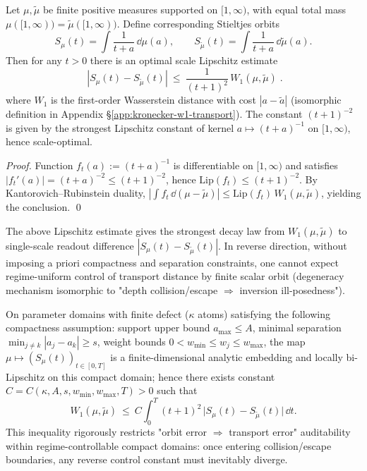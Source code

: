 \begin{proposition}\label{prop:xi-stieltjes-w1-lipschitz}
Let \(\mu,\tilde\mu\) be finite positive measures supported on \([1,\infty)\), with equal total mass
\(\mu([1,\infty))=\tilde\mu([1,\infty))\).
Define corresponding Stieltjes orbits
\[
S_\mu(t)=\int\frac{1}{t+a}\,\dd\mu(a),
\qquad
S_{\tilde\mu}(t)=\int\frac{1}{t+a}\,\dd\tilde\mu(a).
\]
Then for any \(t>0\) there is an optimal scale Lipschitz estimate
\[
\boxed{\;
|S_\mu(t)-S_{\tilde\mu}(t)|
\ \le\ \frac{1}{(t+1)^2}\,W_1(\mu,\tilde\mu)\; }.
\]
where \(W_1\) is the first-order Wasserstein distance with cost \(|a-\tilde a|\) (isomorphic definition in Appendix \S\ref{app:kronecker-w1-transport}).
The constant \((t+1)^{-2}\) is given by the strongest Lipschitz constant of kernel \(a\mapsto (t+a)^{-1}\) on \([1,\infty)\), hence scale-optimal.
\end{proposition}
\begin{proof}
Function \(f_t(a):=(t+a)^{-1}\) is differentiable on \([1,\infty)\) and satisfies
\(
|f_t'(a)|=(t+a)^{-2}\le (t+1)^{-2}
\),
hence \(\mathrm{Lip}(f_t)\le (t+1)^{-2}\).
By Kantorovich--Rubinstein duality,
\(
|\int f_t\,\dd(\mu-\tilde\mu)|\le \mathrm{Lip}(f_t)\,W_1(\mu,\tilde\mu)
\),
yielding the conclusion. \qed
\end{proof}

\begin{remark}\label{rem:xi-stieltjes-w1-local-inverse}
The above Lipschitz estimate gives the strongest decay law from \(W_1(\mu,\tilde\mu)\) to single-scale readout difference \(|S_\mu(t)-S_{\tilde\mu}(t)|\).
In reverse direction, without imposing a priori compactness and separation constraints, one cannot expect regime-uniform control of transport distance by finite scalar orbit (degeneracy mechanism isomorphic to "depth collision/escape \(\Rightarrow\) inversion ill-posedness").
\par
On parameter domains with finite defect (\(\kappa\) atoms) satisfying the following compactness assumption: support upper bound \(a_{\max}\le A\), minimal separation \(\min_{j\ne k}|a_j-a_k|\ge s\), weight bounds \(0<w_{\min}\le w_j\le w_{\max}\), the map
\(
\mu\mapsto (S_\mu(t))_{t\in[0,T]}
\)
is a finite-dimensional analytic embedding and locally bi-Lipschitz on this compact domain; hence there exists constant \(C=C(\kappa,A,s,w_{\min},w_{\max},T)>0\) such that
\[
W_1(\mu,\tilde\mu)\ \le\ C\int_{0}^{T}(t+1)^2\,\bigl|S_\mu(t)-S_{\tilde\mu}(t)\bigr|\,\dd t.
\]
This inequality rigorously restricts "orbit error \(\Rightarrow\) transport error" auditability within regime-controllable compact domains: once entering collision/escape boundaries, any reverse control constant must inevitably diverge.
\end{remark}

